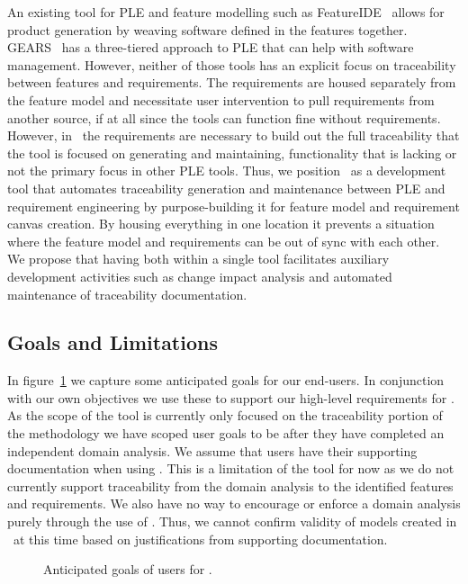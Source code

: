 An existing tool for PLE and feature modelling such as FeatureIDE~\cite{kastner2009featureide, thum2014featureide} allows for product generation by weaving software defined in the features together. GEARS~\cite{GEARS} has a three-tiered approach to PLE that can help with software management. However, neither of those tools has an explicit focus on traceability between features and requirements. The requirements are housed separately from the feature model and necessitate user intervention to pull requirements from another source, if at all since the tools can function fine without requirements. However, in \tool\ the requirements are necessary to build out the full traceability that the tool is focused on generating and maintaining, functionality that is lacking or not the primary focus in other PLE tools. Thus, we position \tool\ as a development tool that automates traceability generation and maintenance between PLE and requirement engineering by purpose-building it for feature model and requirement canvas creation. By housing everything in one location it prevents a situation where the feature model and requirements can be out of sync with each other. We propose that having both within a single tool facilitates auxiliary development activities such as change impact analysis and automated maintenance of traceability documentation.

\subsection{Goals and Limitations}

In figure~\ref{fig:CyclicL_goals} we capture some anticipated goals for our end-users. In conjunction with our own objectives we use these to support our high-level requirements for \tool. As the scope of the tool is currently only focused on the traceability portion of the methodology we have scoped user goals to be after they have completed an independent domain analysis. We assume that users have their supporting documentation when using \tool. This is a limitation of the tool for now as we do not currently support traceability from the domain analysis to the identified features and requirements. We also have no way to encourage or enforce a domain analysis purely through the use of \tool. Thus, we cannot confirm validity of models created in \tool\ at this time based on justifications from supporting documentation.

\begin{figure}
	\centering
	
	\caption{Anticipated goals of users for \tool.}
	\label{fig:CyclicL_goals}
\end{figure}

